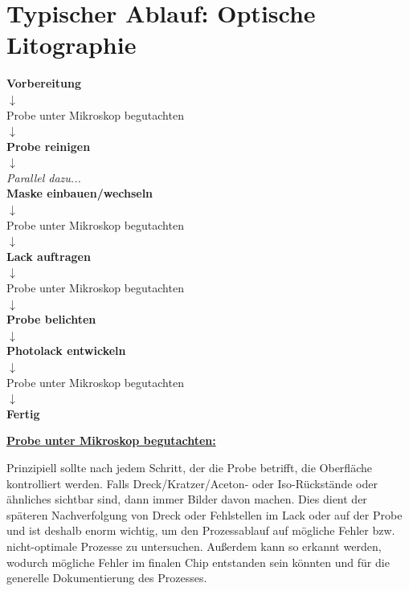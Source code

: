 \documentclass[
  ngerman,
  twoside,
  captions=tableheading,
  BCOR=.5cm,
  fontsize=11,
  ]{scrreprt}
\begin{document}
\tableofcontents

\newpage

\chapter{Typischer Ablauf: Optische Litographie}
\begin{center}
\textbf{Vorbereitung}\\
$\downarrow$\\
Probe unter Mikroskop begutachten\\
$\downarrow$\\
\textbf{Probe reinigen}\\
$\downarrow$\\
\textit{Parallel dazu...}\\
\textbf{Maske einbauen/wechseln}\\
$\downarrow$\\
Probe unter Mikroskop begutachten\\
$\downarrow$\\
\textbf{Lack auftragen}\\
$\downarrow$\\
Probe unter Mikroskop begutachten\\
$\downarrow$\\
\textbf{Probe belichten}\\
$\downarrow$\\
\textbf{Photolack entwickeln}\\
$\downarrow$\\
Probe unter Mikroskop begutachten\\
$\downarrow$\\
\textbf{Fertig}
\end{center}

\begin{center}
\underline{\textbf{Probe unter Mikroskop begutachten:}}
\end{center}

Prinzipiell sollte nach jedem Schritt, der die Probe betrifft, die Oberfläche kontrolliert werden. Falls Dreck/Kratzer/Aceton- oder Iso-Rückstände oder ähnliches sichtbar sind, dann immer Bilder davon machen. Dies dient der späteren Nachverfolgung von Dreck oder Fehlstellen im Lack oder auf der Probe und ist deshalb enorm wichtig, um den Prozessablauf auf mögliche Fehler bzw. nicht-optimale Prozesse zu untersuchen. Außerdem kann so erkannt werden, wodurch mögliche Fehler im finalen Chip entstanden sein könnten und für die generelle Dokumentierung des Prozesses. 
\end{document}
